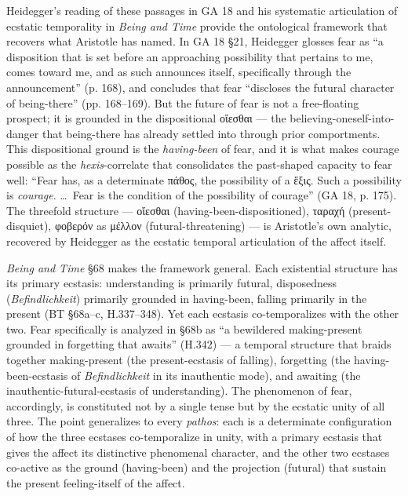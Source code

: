 \documentclass{article}
\newcommand{\gk}[1]{{\greekfont #1}}
\begin{document}
Heidegger's reading of these passages in GA 18 and his systematic articulation of ecstatic temporality in \textit{Being and Time} provide the ontological framework that recovers what Aristotle has named. In GA 18 \S21, Heidegger glosses fear as ``a disposition that is set before an approaching possibility that pertains to me, comes toward me, and as such announces itself, specifically through the announcement'' (p. 168), and concludes that fear ``discloses the futural character of being-there'' (pp. 168--169). But the future of fear is not a free-floating prospect; it is grounded in the dispositional \gk{οἴεσθαι} --- the believing-oneself-into-danger that being-there has already settled into through prior comportments. This dispositional ground is the \textit{having-been} of fear, and it is what makes courage possible as the \textit{hexis}-correlate that consolidates the past-shaped capacity to fear well: ``Fear has, as a determinate \gk{πάθος}, the possibility of a \gk{ἕξις}. Such a possibility is \textit{courage}. \ldots\ Fear is the condition of the possibility of courage'' (GA 18, p. 175). The threefold structure --- \gk{οἴεσθαι} (having-been-dispositioned), \gk{ταραχή} (present-disquiet), \gk{φοβερόν} as \gk{μέλλον} (futural-threatening) --- is Aristotle's own analytic, recovered by Heidegger as the ecstatic temporal articulation of the affect itself.

\textit{Being and Time} \S68 makes the framework general. Each existential structure has its primary ecstasis: understanding is primarily futural, disposedness (\textit{Befindlichkeit}) primarily grounded in having-been, falling primarily in the present (BT \S68a--c, H.337--348). Yet each ecstasis co-temporalizes with the other two. Fear specifically is analyzed in \S68b as ``a bewildered making-present grounded in forgetting that awaits'' (H.342) --- a temporal structure that braids together making-present (the present-ecstasis of falling), forgetting (the having-been-ecstasis of \textit{Befindlichkeit} in its inauthentic mode), and awaiting (the inauthentic-futural-ecstasis of understanding). The phenomenon of fear, accordingly, is constituted not by a single tense but by the ecstatic unity of all three. The point generalizes to every \textit{pathos}: each is a determinate configuration of how the three ecstases co-temporalize in unity, with a primary ecstasis that gives the affect its distinctive phenomenal character, and the other two ecstases co-active as the ground (having-been) and the projection (futural) that sustain the present feeling-itself of the affect.
\end{document}
